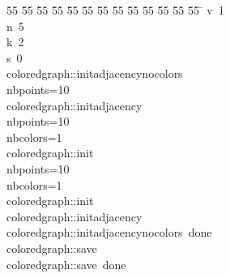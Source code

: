 %
%
\begin{tabbing}
55 \= 55 \= 55 \= 55 \= 55 \= 55 \= 55 \= 55 \= 55 \= 55 \= 55 \= 55 \= 55 \= \kill
{}v\ 1\\[0pt]
n\ 5\\[0pt]
k\ 2\\[0pt]
s\ 0\\[0pt]
coloredgraph::initadjacencynocolors\\[0pt]
nbpoints=10\\[0pt]
coloredgraph::initadjacency\\[0pt]
nbpoints=10\\[0pt]
nbcolors=1\\[0pt]
coloredgraph::init\\[0pt]
nbpoints=10\\[0pt]
nbcolors=1\\[0pt]
coloredgraph::init\\[0pt]
coloredgraph::initadjacency\\[0pt]
coloredgraph::initadjacencynocolors\ done\\[0pt]
coloredgraph::save\\[0pt]
coloredgraph::save\ done\\[0pt]
\end{tabbing}
